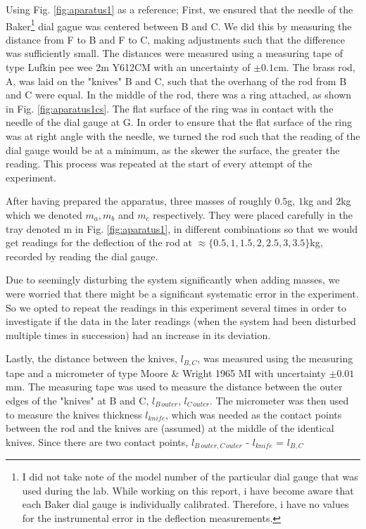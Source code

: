 \documentclass[11pt,a4paper]{article}
\begin{document}
    Using Fig. \ref{fig:aparatus1} as a reference; First, we ensured that the needle of the Baker\footnote{I did not take note of the model number of the particular dial gauge that was used during the lab. While working on this report, i have become aware that each Baker dial gauge is individually calibrated. Therefore, i have no values for the instrumental error in the deflection measurements.} dial gague was centered between B and C. We did this by measuring the distance from F to B and F to C, making adjustments such that the difference was sufficiently small. The distances were measured using a measuring tape of type Lufkin pee wee 2m Y612CM with an uncertainty of $\pm 0.1$cm. The brass rod, A, was laid on the "knives" B and C, such that the overhang of the rod from B and C were equal. In the middle of the rod, there was a ring attached, as shown in Fig. \ref{fig:aparatus1cs}. The flat surface of the ring was in contact with the needle of the dial gauge at G. In order to ensure that the flat surface of the ring was at right angle with the needle, we turned the rod such that the reading of the dial gauge would be at a minimum, as the skewer the surface, the greater the reading. This process was repeated at the start of every attempt of the experiment.

    After having prepared the apparatus, three masses of roughly $0.5$g, $1$kg and $2$kg which we denoted $m_a, m_b$ and $m_c$ respectively. They were placed carefully in the tray denoted m in Fig. \ref{fig:aparatus1}, in different combinations so that we would get readings for the deflection of the rod at $\approx \{0.5, 1, 1.5, 2, 2.5, 3, 3.5\}$kg, recorded by reading the dial gauge.

    Due to seemingly disturbing the system significantly when adding masses, we were worried that there might be a significant systematic error in the experiment. So we opted to repeat the readings in this experiment several times in order to investigate if the data in the later readings (when the system had been disturbed multiple times in succession) had an increase in its deviation.

    Lastly, the distance between the knives, $l_{B, C}$, was measured using the measuring tape and a micrometer of type Moore \& Wright 1965 MI with uncertainty $\pm0.01$mm. The measuring tape was used to measure the distance between the outer edges of the "knives" at B and C, $l_{B\, outer}$, $l_{C\, outer}$. The micrometer was then used to measure the knives thickness $l_{knife}$, which was needed as the contact points between the rod and the knives are (assumed) at the middle of the identical knives. Since there are two contact points, $l_{B\,outer, C\, outer}$ - $l_{knife}$ = $l_{B, C}$
    
\end{document}
